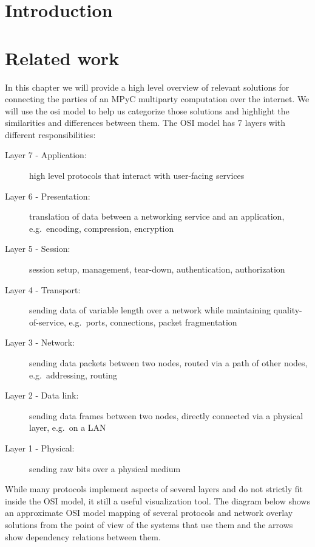 \tableofcontents

\printnoidxglossary[type=\acronymtype,title=List of Abbreviations]
\listoffigures

\mainmatter

\hypertarget{introduction}{%
\chapter{Introduction}\label{introduction}}

\hypertarget{related-work}{%
\chapter{Related work}\label{related-work}}

In this chapter we will provide a high level overview of relevant
solutions for connecting the parties of an MPyC multiparty computation
over the internet. We will use the \gls{osi} model to help us categorize
those solutions and highlight the similarities and differences between
them. The OSI model has 7 layers with different responsibilities:

\begin{description}
\item[Layer 7 - Application:]
high level protocols that interact with user-facing services
\item[Layer 6 - Presentation:]
translation of data between a networking service and an application,
e.g.~encoding, compression, encryption
\item[Layer 5 - Session:]
session setup, management, tear-down, authentication, authorization
\item[Layer 4 - Transport:]
sending data of variable length over a network while maintaining
quality-of-service, e.g.~ports, connections, packet fragmentation
\item[Layer 3 - Network:]
sending data packets between two nodes, routed via a path of other
nodes, e.g.~addressing, routing
\item[Layer 2 - Data link:]
sending data frames between two nodes, directly connected via a physical
layer, e.g.~on a LAN
\item[Layer 1 - Physical:]
sending raw bits over a physical medium
\end{description}

While many protocols implement aspects of several layers and do not
strictly fit inside the OSI model, it still a useful visualization tool.
The diagram below shows an approximate OSI model mapping of several
protocols and network overlay solutions from the point of view of the
systems that use them and the arrows show dependency relations between
them.

